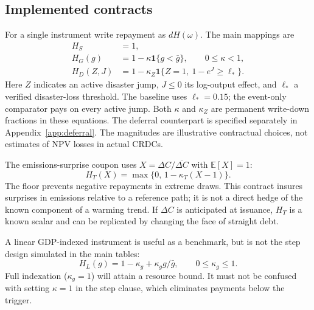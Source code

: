 \documentclass[11pt]{article}
\newcommand{\E}{\mathbb E}
\newcommand{\ind}{\mathbf 1}
\begin{document}
\subsection{Implemented contracts}
For a single instrument write repayment as $dH(\omega)$. The main mappings are
\begin{align}
 H_S&=1,\label{eq:Hstraight}\\
 H_G(g)&=1-\kappa\ind\{g<\bar g\},\qquad 0\le\kappa<1,\label{eq:Hgdp}\\
 H_D(Z,J)&=1-\kappa_Z\ind\{Z=1,\ 1-e^J\ge\ell_*\}.\label{eq:Hdis}
\end{align}
Here $Z$ indicates an active disaster jump, $J\le0$ its log-output effect, and $\ell_*$ a verified disaster-loss threshold. The baseline uses $\ell_*=0.15$; the event-only comparator pays on every active jump. Both $\kappa$ and $\kappa_Z$ are permanent write-down fractions in these equations. The deferral counterpart is specified separately in Appendix~\ref{app:deferral}. The magnitudes are illustrative contractual choices, not estimates of NPV losses in actual CRDCs.

The emissions-surprise coupon uses $X=\Delta C/\overline{\Delta C}$ with $\E[X]=1$:
\begin{equation}\label{eq:temp_linked}
 H_T(X)=\max\{0,\,1-\kappa_T(X-1)\}.
\end{equation}
The floor prevents negative repayments in extreme draws. This contract insures surprises in emissions relative to a reference path; it is not a direct hedge of the known component of a warming trend. If $\Delta C$ is anticipated at issuance, $H_T$ is a known scalar and can be replicated by changing the face of straight debt.

A linear GDP-indexed instrument is useful as a benchmark, but is not the step design simulated in the main tables:
\begin{equation}\label{eq:linear}
 H_L(g)=1-\kappa_g+\kappa_g g/\bar g,\qquad 0\le\kappa_g\le1.
\end{equation}
Full indexation ($\kappa_g=1$) will attain a resource bound. It must not be confused with setting $\kappa=1$ in the step clause, which eliminates payments below the trigger.
\end{document}
